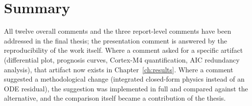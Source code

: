 \section*{Summary}

All twelve overall comments and the three report-level comments have been
addressed in the final thesis; the presentation comment is answered by the
reproducibility of the work itself. Where a comment asked for a specific
artifact (differential plot, prognosis curves, Cortex-M4 quantification, AIC
redundancy analysis), that artifact now exists in Chapter~\ref{ch:results}.
Where a comment suggested a methodological change (integrated closed-form
physics instead of an ODE residual), the suggestion was implemented in full and
compared against the alternative, and the comparison itself became a
contribution of the thesis.
